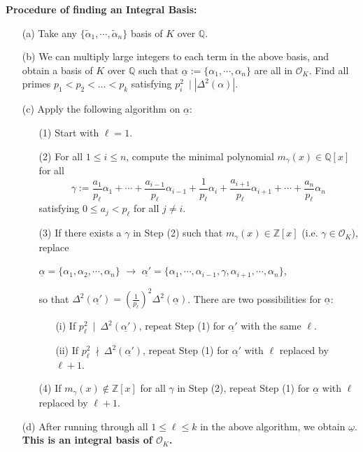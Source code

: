 \documentclass[11pt]{book}
\begin{document}
\noindent \textbf{Procedure of finding an Integral Basis:}
\begin{enumerate}
    \item[(a)] Take any  $\{\tilde{\alpha}_1,\cdots,\tilde{\alpha}_n\}$ basis of $K$ over $\mathbb{Q}$.
    \item[(b)] We can multiply large integers to each term in the above basis, and obtain a basis of $K$ over $\mathbb{Q}$ such that $\underline{\alpha}:=\{ \alpha_1,\cdots,\alpha_n\}$ are all in $\mathcal{O}_K$.
    Find all primes $p_1 < p_2 < \dots < p_k$ satisfying $p_i^2\ \mid |\Delta^2(\alpha)|$.
    
    \item[(c)] Apply the following algorithm on $\underline{\alpha}$:
    \begin{itemize}
        \item[(1)]  Start with $\ell = 1$.
        \item[(2)] For all $1 \leq i \leq n$, compute the minimal polynomial $m_{\gamma}(x) \in \mathbb{Q}[x]$ for all  $$\gamma:=\frac{a_1}{p_{\ell}}\alpha_1+\cdots+\frac{a_{i-1}}{p_{\ell}}\alpha_{i-1}+\frac{1}{p_{\ell}}\alpha_i+\frac{a_{i+1}}{p_{\ell}}\alpha_{i+1}+\cdots+\frac{a_n}{p_{\ell}}\alpha_n$$
    satisfying $0 \leq a_j < p_{\ell}$ for all $j \neq i$.
        \item[(3)] If there exists a $\gamma$ in Step (2) such that $m_{\gamma}(x)\in \mathbb{Z}[x]$ (i.e. $\gamma \in \mathcal{O}_K$), replace 
    \begin{center}
    $\underline{\alpha}=\{\alpha_1,\alpha_2,\cdots,\alpha_n\}$ \quad $\longrightarrow$ \quad $\underline{\alpha'}=\{\alpha_1,\cdots,\alpha_{i-1},\gamma,\alpha_{i+1},\cdots, \alpha_n\}$,    
    \end{center}
     so that $\Delta^2(\underline{\alpha'})=(\frac{1}{p_{\ell}})^2\Delta^2(\underline{\alpha})$. There are two possibilities for $\underline{\alpha}$:
     \begin{itemize}
         \item[(i)] If $p_{\ell}^2\ \mid\ \Delta^2(\underline{\alpha'})$, repeat Step (1) for $\underline{\alpha'}$ with the same $\ell$.
         \item[(ii)] If $p_{\ell}^2\ \nmid\ \Delta^2(\underline{\alpha'})$, repeat Step (1) for $\underline{\alpha'}$ with $\ell$ replaced by $\ell+1$. 
     \end{itemize}
     \item[(4)] If $m_{\gamma}(x)\notin \mathbb{Z}[x]$ for all $\gamma$ in Step (2), repeat Step (1) for $\underline{\alpha}$ with $\ell$ replaced by $\ell+1$.
    \end{itemize}
    
    \item[(d)] After running through all $1 \leq \ell \leq k$ in the above algorithm, we obtain $\underline{\omega}$. {\bf This is an integral basis of $\mathcal{O}_K$.}
\end{enumerate}
\end{document}
